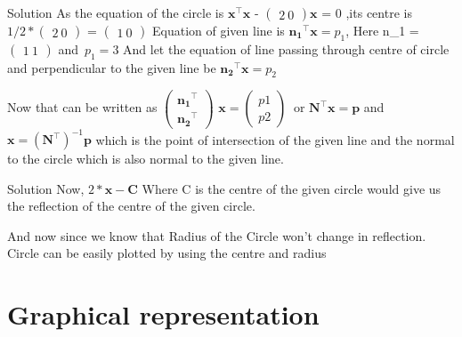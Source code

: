 \documentclass{beamer}
\begin{document}
\begin{frame}{Solution}
As the equation of the circle is
$\mathbf{x}^\intercal \mathbf{x}$ - $\begin{pmatrix} 2\ 0 \end{pmatrix}\mathbf{x}$ = 0
,its centre is $1/2*\begin{pmatrix} 2\ 0 \end{pmatrix}$ = $\begin{pmatrix} 1\ 0 \end{pmatrix}$
Equation of given line is $\mathbf{n_{1}}^\intercal \mathbf{x} = p_{1}$,
Here n_{1} = $\begin{pmatrix} 1\ 1 \end{pmatrix}$  and\  $p_{1} = 3$
And let the equation of line passing through centre of circle and perpendicular to the given line be
 $\mathbf{n_{2}}^\intercal \mathbf{x} = p_{2}$

Now that can be written as $\begin{pmatrix}\mathbf{n_{1}}^\intercal \\ \mathbf{n_{2}}^\intercal \end{pmatrix}$ $\mathbf{x} = \begin{pmatrix} p{1}\\ p{2} \end{pmatrix}\ $
or $\mathbf{N}^\intercal\mathbf{x} = \mathbf{p}$ 
 and $\mathbf{x}=(\mathbf{N}^\intercal)^{-1}\mathbf{p}$ which is the point of intersection of the given line and the normal to the circle which is also normal to the given line.

\end{frame}

\begin{frame}{Solution}
Now, $ 2*\mathbf{x} - \mathbf{C} $ Where C is the centre of the given circle would give us the reflection of the centre of the given circle.

And now since we know that Radius of the Circle won't change in reflection.
Circle can be easily plotted by using the centre and radius
\end{frame}

\section{Graphical representation}
\end{document}
